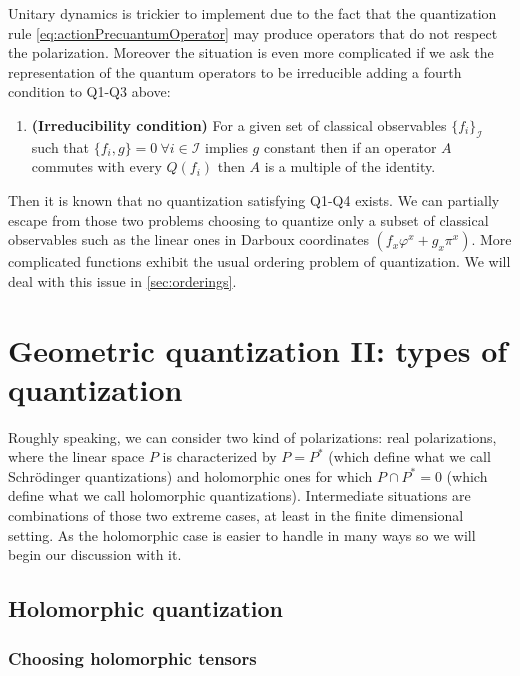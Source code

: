 \documentclass[12pt]{article}%
\begin{document}
Unitary dynamics is trickier to implement due to the fact that the quantization rule \eqref{eq:actionPrecuantumOperator} may produce operators that do not respect the polarization. Moreover the situation is even more complicated if we ask the representation of the quantum operators to be irreducible adding a fourth condition to Q1-Q3 above:

\begin{enumerate}[label=Q4)]
    \item {\bf (Irreducibility condition)} For a given set of classical observables $\{f_i\}_{\mathcal{I}}$ such that $\{f_i,g\}=0\ \forall i\in \mathcal{I}$ implies $g$ constant then if an operator $A$ commutes with every $Q(f_i)$ then $A$ is a multiple of the identity.
\end{enumerate}

Then it is known that no quantization satisfying Q1-Q4 exists. We can partially escape from those two problems choosing to quantize only a subset of classical observables such as the linear ones in Darboux coordinates $(f_x\varphi^x+g_x\pi^x)$. More complicated functions  exhibit the usual ordering problem of quantization.  We will deal with this issue in \autoref{sec:orderings}. 

\section{Geometric quantization II:  types of quantization}
\label{subsec:holom}  
Roughly speaking, we can consider two kind of polarizations: real polarizations, where the linear space $P$ is characterized by $P=P^*$ (which define what we call Schrödinger quantizations) and holomorphic ones for which $P\cap P^* =0$ (which define what we call holomorphic quantizations). Intermediate situations are combinations of those two extreme cases, at least in the finite dimensional setting. As the holomorphic case is easier to handle in many ways so we will begin our discussion with it. 

\subsection{Holomorphic quantization}

\subsubsection{Choosing holomorphic tensors}
\end{document}
